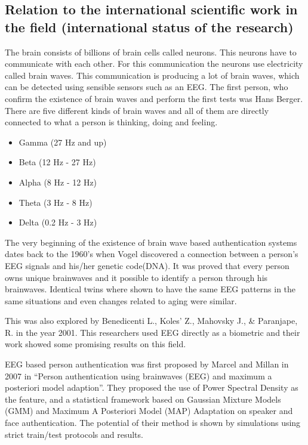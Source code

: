 \subsection{Relation to the international scientific work in the field (international status of the research)}
The brain consists of billions of brain cells called neurons. This neurons have to communicate with each other. For this communication the neurons use electricity called brain waves. This communication is producing a lot of brain waves, which can be detected using sensible sensors such as an EEG. The first person, who confirm the existence of brain waves and perform the first tests was Hans Berger. There are five different kinds of brain waves and all of them are directly connected to what a person is thinking, doing and feeling.

\begin{itemize}
 \item Gamma (27 Hz and up)
 \item Beta (12 Hz - 27 Hz)
 \item Alpha (8 Hz - 12 Hz)
 \item Theta (3 Hz - 8 Hz)
 \item Delta (0.2 Hz - 3 Hz)
\end{itemize}

The very beginning of the existence of brain wave based authentication systems dates back to the 1960's when Vogel discovered a connection between a person's EEG signals and his/her genetic code(DNA). It was proved that every person owns unique brainwaves and it possible to identify a person through his brainwaves. Identical twins where shown to have the same EEG patterns in the same situations and even changes related to aging were similar. 


This was also explored by Benedicenti L., Koles’ Z., Mahovsky J., \& Paranjape, R. in the year 2001. This researchers used EEG directly as a biometric and their work showed some promising results on this field.


EEG based person authentication was first proposed by Marcel and Millan in 2007 in “Person authentication using brainwaves (EEG) and maximum a posteriori model adaption”. They proposed the use of  Power Spectral Density as the feature, and a statistical framework based on Gaussian Mixture  Models (GMM) and Maximum A Posteriori Model (MAP) Adaptation on speaker and face  authentication. The potential of their method is shown by simulations using strict train/test protocols and results. 

